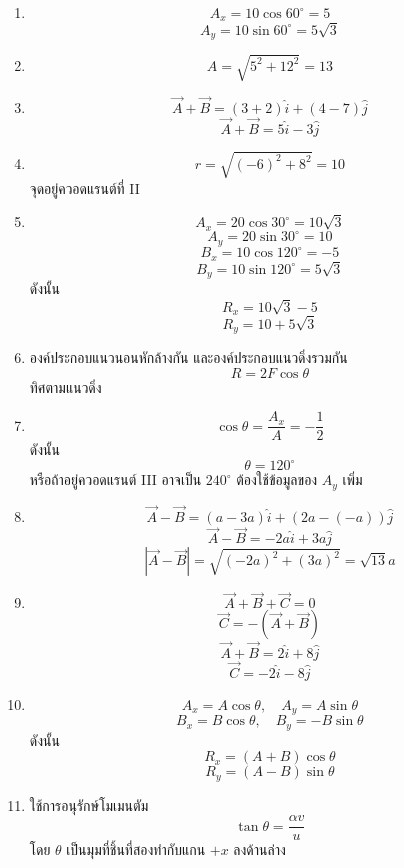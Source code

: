 \begin{enumerate}
    \item
    \[
    A_x=10\cos60^\circ=5
    \]
    \[
    A_y=10\sin60^\circ=5\sqrt{3}
    \]

    \item
    \[
    A=\sqrt{5^2+12^2}=13
    \]

    \item
    \[
    \vec{A}+\vec{B}=(3+2)\hat{i}+(4-7)\hat{j}
    \]
    \[
    \vec{A}+\vec{B}=5\hat{i}-3\hat{j}
    \]

    \item
    \[
    r=\sqrt{(-6)^2+8^2}=10
    \]
    จุดอยู่ควอดแรนต์ที่ II

    \item
    \[
    A_x=20\cos30^\circ=10\sqrt{3}
    \]
    \[
    A_y=20\sin30^\circ=10
    \]
    \[
    B_x=10\cos120^\circ=-5
    \]
    \[
    B_y=10\sin120^\circ=5\sqrt{3}
    \]
    ดังนั้น
    \[
    R_x=10\sqrt{3}-5
    \]
    \[
    R_y=10+5\sqrt{3}
    \]

    \item
    องค์ประกอบแนวนอนหักล้างกัน และองค์ประกอบแนวดิ่งรวมกัน
    \[
    R=2F\cos\theta
    \]
    ทิศตามแนวดิ่ง

    \item
    \[
    \cos\theta=\frac{A_x}{A}=-\frac{1}{2}
    \]
    ดังนั้น
    \[
    \theta=120^\circ
    \]
    หรือถ้าอยู่ควอดแรนต์ III อาจเป็น $240^\circ$ ต้องใช้ข้อมูลของ $A_y$ เพิ่ม

    \item
    \[
    \vec{A}-\vec{B}=(a-3a)\hat{i}+(2a-(-a))\hat{j}
    \]
    \[
    \vec{A}-\vec{B}=-2a\hat{i}+3a\hat{j}
    \]
    \[
    |\vec{A}-\vec{B}|=\sqrt{(-2a)^2+(3a)^2}=\sqrt{13}a
    \]

    \item
    \[
    \vec{A}+\vec{B}+\vec{C}=0
    \]
    \[
    \vec{C}=-(\vec{A}+\vec{B})
    \]
    \[
    \vec{A}+\vec{B}=2\hat{i}+8\hat{j}
    \]
    \[
    \vec{C}=-2\hat{i}-8\hat{j}
    \]

    \item
    \[
    A_x=A\cos\theta,\quad A_y=A\sin\theta
    \]
    \[
    B_x=B\cos\theta,\quad B_y=-B\sin\theta
    \]
    ดังนั้น
    \[
    R_x=(A+B)\cos\theta
    \]
    \[
    R_y=(A-B)\sin\theta
    \]

    \item
    ใช้การอนุรักษ์โมเมนตัม
    \[
    \tan\theta=\frac{\alpha v}{u}
    \]
    โดย $\theta$ เป็นมุมที่ชิ้นที่สองทำกับแกน $+x$ ลงด้านล่าง


\end{enumerate}
